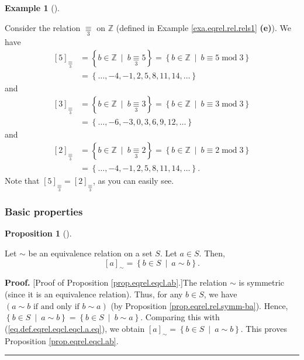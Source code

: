 \documentclass[numbers=enddot,12pt,final,onecolumn,notitlepage]{scrartcl}%
\numberwithin{exer}{subsection}
\theoremstyle{definition}
\newtheorem{prop}[theo]{Proposition}
\newenvironment{proposition}[1][]
{\begin{prop}[#1]\begin{leftbar}}
{\end{leftbar}\end{prop}}
\newtheorem{exam}[theo]{Example}
\newenvironment{example}[1][]
{\begin{exam}[#1]\begin{leftbar}}
{\end{leftbar}\end{exam}}
\newenvironment{proof}[1][Proof]{\noindent\textbf{#1.} }{\ \rule{0.5em}{0.5em}}
\begin{document}
\begin{example}
\label{exa.eqrel.eqcl.mod3}Consider the relation $\underset{3}{\equiv}$ on
$\mathbb{Z}$ (defined in Example \ref{exa.eqrel.rel.rels1} \textbf{(e)}). We
have%
\begin{align*}
\left[  5\right]  _{\underset{3}{\equiv}}  &  =\left\{  b\in\mathbb{Z}%
\ \mid\ b\underset{3}{\equiv}5\right\}  =\left\{  b\in\mathbb{Z}%
\ \mid\ b\equiv5\operatorname{mod}3\right\} \\
&  =\left\{  \ldots,-4,-1,2,5,8,11,14,\ldots\right\}
\end{align*}
and%
\begin{align*}
\left[  3\right]  _{\underset{3}{\equiv}}  &  =\left\{  b\in\mathbb{Z}%
\ \mid\ b\underset{3}{\equiv}3\right\}  =\left\{  b\in\mathbb{Z}%
\ \mid\ b\equiv3\operatorname{mod}3\right\} \\
&  =\left\{  \ldots,-6,-3,0,3,6,9,12,\ldots\right\}
\end{align*}
and%
\begin{align*}
\left[  2\right]  _{\underset{3}{\equiv}}  &  =\left\{  b\in\mathbb{Z}%
\ \mid\ b\underset{3}{\equiv}2\right\}  =\left\{  b\in\mathbb{Z}%
\ \mid\ b\equiv2\operatorname{mod}3\right\} \\
&  =\left\{  \ldots,-4,-1,2,5,8,11,14,\ldots\right\}  .
\end{align*}
Note that $\left[  5\right]  _{\underset{3}{\equiv}}=\left[  2\right]
_{\underset{3}{\equiv}}$, as you can easily see.
\end{example}

\subsubsection{Basic properties}

\begin{proposition}
\label{prop.eqrel.eqcl.ab}Let $\sim$ be an equivalence relation on a set $S$.
Let $a\in S$. Then,%
\[
\left[  a\right]  _{\sim}=\left\{  b\in S\ \mid\ a\sim b\right\}  .
\]

\end{proposition}

\begin{proof}
[Proof of Proposition \ref{prop.eqrel.eqcl.ab}.]The relation $\sim$ is
symmetric (since it is an equivalence relation). Thus, for any $b\in S$, we
have $\left(  a\sim b\text{ if and only if }b\sim a\right)  $ (by Proposition
\ref{prop.eqrel.rel.symm-ba}). Hence, $\left\{  b\in S\ \mid\ a\sim b\right\}
=\left\{  b\in S\ \mid\ b\sim a\right\}  $. Comparing this with
(\ref{eq.def.eqrel.eqcl.eqcl.a.eq}), we obtain $\left[  a\right]  _{\sim
}=\left\{  b\in S\ \mid\ a\sim b\right\}  $. This proves Proposition
\ref{prop.eqrel.eqcl.ab}.
\end{proof}
\end{document}
